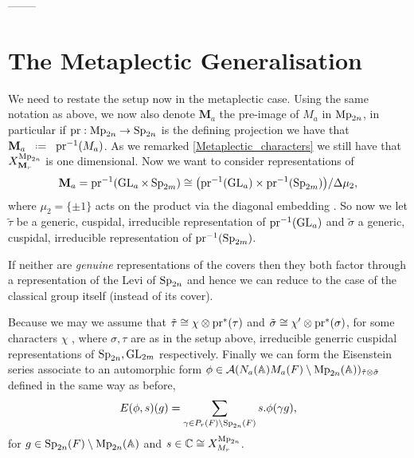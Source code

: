     --------

    \begin{Theorem}
        
    \end{Theorem}

    


    \section{The Metaplectic Generalisation}
    We need to restate the setup now in the metaplectic case. Using the same notation as above, we now also denote \(\mathbf{M}_a\) the pre-image of \(M_a\) in \(\operatorname{Mp}_{2n}\), in particular if \(\mathrm{pr}: \operatorname{Mp}_{2n} \to \operatorname{Sp}_{2n}\) is the defining projection we have that \(\mathbf{M}_a \defeq \mathrm{pr}\inv(M_a)\). As we remarked \ref{Metaplectic_characters} we still have that \(X_{\mathbf{M}_r}^{\operatorname{Mp}_{2n}}\) is one dimensional. Now we want to consider representations of 
    \[\mathbf{M}_a = \mathrm{pr}^{-1}(\operatorname{GL}_a \times \operatorname{Sp}_{2m}) \cong \big(\mathrm{pr}^{-1}(\operatorname{GL}_a)\times \mathrm{pr}^{-1}(\operatorname{Sp}_{2m})\big)/\Delta \mu_2,\]
    where \(\mu_2 = \{\pm 1\}\) acts on the product via the diagonal embedding .
    So now we let \(\tilde{\tau}\) be a generic, cuspidal, irreducible representation of \(\mathrm{pr}^{-1}(\operatorname{GL}_a)\) and \(\tilde{\sigma}\) a generic, cuspidal, irreducible representation of \(\mathrm{pr}^{-1}(\operatorname{Sp}_{2m})\). 

    \begin{remark}
        If neither are \textit{genuine} representations of the covers then they both factor through a representation of the Levi of \(\operatorname{Sp}_{2n}\) and hence we can reduce to the case of the classical group itself (instead of its cover).
    \end{remark}

    Because we may  we assume that \(\tilde{\tau} \cong \chi\otimes \mathrm{pr}^*(\tau)\) and \(\tilde{\sigma} \cong \chi'\otimes \mathrm{pr}^*(\sigma)\), for some characters \(\chi\) , where \(\sigma, \tau\) are as in the setup above, irreducible generric cuspidal representations of \(\operatorname{Sp}_{2n}, \operatorname{GL}_{2m}\) respectively.
    Finally we can form the Eisenstein series associate to an automorphic form \(\phi\in \mathcal{A}(N_a(\A)M_a(F)\setminus \Mp_{2n}(\A) )_{\tilde{\tau}\tensor \tilde\sigma}\) defined in the same way as before,
    \[E(\phi, s)(g) = \sum_{\gamma\in P_r(F) \setminus \Sp_{2n}(F)} s.\phi(\gamma g),\]
    for \(g\in \Sp_{2n}(F) \setminus \Mp_{2n}(\A)\) and \(s\in \C \cong X^{\Mp_{2n}}_{M_r}\).

